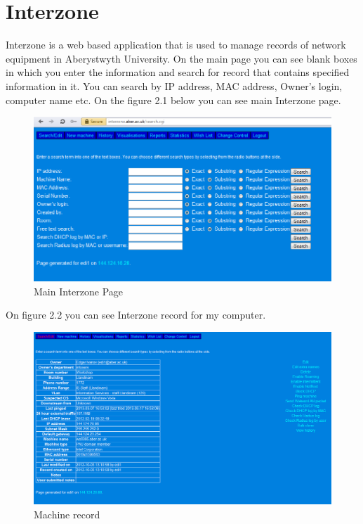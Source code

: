 \documentclass[10pt,a4paper,headinclude=true]{report}
\begin{document}
\section{Interzone}
Interzone is a web based application that is used to manage records of network equipment in Aberystwyth University. On the main page you can see blank boxes in which you enter the information and search for record that contains specified information in it. You can search by IP address, MAC address, Owner's login, computer name etc. On the figure 2.1 below you can see main Interzone page.

\begin{figure}[htbp]
\centering
\centerline{\includegraphics[scale=0.5]{./main_interzone_page}}
\caption{Main Interzone Page}
\label{fig:main_interzone_page}
\end{figure}

On figure 2.2 you can see Interzone record for my computer.

\begin{figure}[htbp]
\centering
\centerline{\includegraphics[scale=0.5]{./machine_record}}
\caption{Machine record}
\label{fig:machine_record}
\end{figure}
\end{document}
